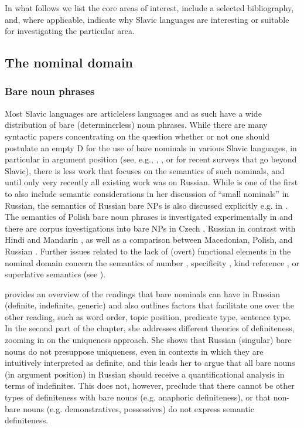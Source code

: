 \documentclass[output=paper,colorlinks,citecolor=brown]{langscibook}
\begin{document}
In what follows we list the core areas of interest, include a selected bibliography, and, where applicable, indicate why Slavic languages are interesting or suitable for investigating the particular area.

\subsection{The nominal domain}

\subsubsection{Bare noun phrases} Most Slavic languages are articleless languages and as such have a wide distribution of bare (determinerless) noun phrases. While there are many syntactic papers concentrating on the question whether or not one should postulate an empty D for the use of bare nominals in various Slavic languages, in particular in argument position (see, e.g., \citealt{Boskovic2007}, \citealt{Koylu2021}, or \citealt{Dayal2026} for recent surveys that go beyond Slavic), there is less work that focuses on the semantics of such nominals, and until only very recently all existing work was on Russian. While \citet{Pereltsvaig2006} is one of the first to also include semantic considerations in her discussion of ``small nominals'' in Russian, the semantics of Russian bare NPs is also discussed explicitly e.g. in \citet{geist10,kaganperel11a,kaganperel11b,muellerreichau15,borik16,simikdemian20,Borik.etal2020,seres20,seresborik21}. The semantics of Polish bare noun phrases is investigated experimentally in \citet{simik-demian21} and there are corpus investigations into bare NPs in Czech %
\citep{simik-burianova20}, Russian in contrast with Hindi and Mandarin \citep[][]{liusalt,liu+SALT}, as well as a comparison between Macedonian, Polish, and Russian \citep[][]{Borik.etal2025}. Further issues related to the lack of (overt) functional elements in the nominal domain concern the semantics of number \citep{ionin_matushansky2006composition}, specificity \citep{Geist2008}, kind reference \citep{mueller11,Kwapiszewski.Fuellenbach21}, or superlative semantics (see ).

 provides an overview of the readings that bare nominals can have in Russian (definite, indefinite, generic) and also outlines factors that facilitate one over the other reading, such as word order, topic position, predicate type, sentence type. In the second part of the chapter, she addresses different theories of definiteness, zooming in on the uniqueness approach. She shows that Russian (singular) bare nouns do not presuppose uniqueness, even in contexts in which they are intuitively interpreted as definite, and this leads her to argue that all bare nouns (in argument position) in Russian should receive a quantificational analysis in terms of indefinites. This does not, however, preclude that there cannot be other types of definiteness with bare nouns (e.g. anaphoric definiteness), or that non-bare nouns (e.g. demonstratives, possessives) do not express semantic definiteness. 
\end{document}
